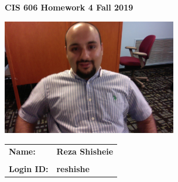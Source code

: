 \documentclass[11pt]{article}
\begin{document}
\thispagestyle{plain}

\begin{center}
{\Large \bf CIS 606 \hfil Homework 4 \hfil Fall 2019} \\
\end{center}

\vskip 1in 

\centerline{\includegraphics[width=3in]{photo.jpg}}

\vskip 0.5in 


\begin{center}
\begin{tabular}{ll}
{\bf Name:}     & {\bf Reza Shisheie } \\ \\
{\bf Login ID:} & {\bf reshishe }   
\end{tabular}
\end{center}

\newpage
\end{document}
